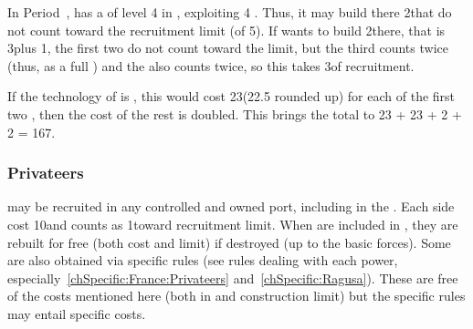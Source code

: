 \begin{exemple}
  In Period~, \FRA has a \COL of level 4 in
  , exploiting 4 . Thus, it may build
  there 2\NDE that do not count toward the recruitment limit (of 5\ND). If
  \FRA wants to build 2\ND there, that is 3\NDE plus 1\ND, the first two \NDE
  do not count toward the limit, but the third counts twice (thus, as a full
  \ND) and the \ND also counts twice, so this takes 3\ND of recruitment.

  If the technology of \FRA is \TBAT, this would cost 23\ducats (22.5 rounded
  up) for each of the first two \NDE, then the cost of the rest is
  doubled. This brings the total to 23 + 23 + 2  + 2
   = 167\ducats.
\end{exemple}

\subsubsection{Privateers}\label{chLogistic:Recruiting Privateers}
\aparag \corsaire may be recruited in any controlled and owned port, including
in the \ROTW.
\bparag Each side cost 10\ducats and counts as 1\ND toward recruitment limit.
\bparag When \corsaire are included in , they are rebuilt
for free (both cost and limit) if destroyed (up to the basic forces).
\bparag Some \corsaire are also obtained via specific rules (see rules dealing
with each power, especially~\ref{chSpecific:France:Privateers}
and~\ref{chSpecific:Ragusa}). These are free of the costs mentioned here (both
in \ducats and construction limit) but the specific rules may entail specific
costs.





